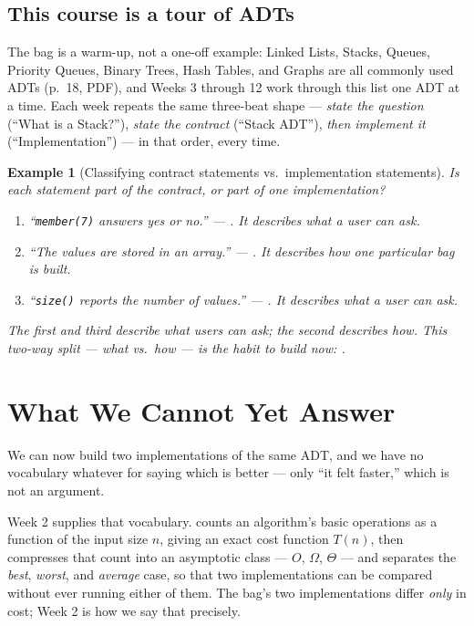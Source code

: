 \documentclass[11pt]{article}
\newtheorem{example}{Example}[section]
\begin{document}
\subsection{This course is a tour of ADTs}

The bag is a warm-up, not a one-off example: Linked Lists, Stacks, Queues,
Priority Queues, Binary Trees, Hash Tables, and Graphs are all
commonly used ADTs \cite{Karumanchi2017_data_structures_algorithms_made_easy}
(p.~18, PDF), and Weeks 3 through 12 work through this list one ADT at a time.
Each week repeats the same three-beat shape --- \emph{state the question}
(``What is a Stack?''), \emph{state the contract} (``Stack ADT''), \emph{then
implement it} (``Implementation'') --- in that order, every time. 

\begin{example}[Classifying contract statements vs.\ implementation statements]
Is each statement part of the contract, or part of one implementation?
\begin{enumerate}
  \item ``\texttt{member(7)} answers yes or no.'' --- . It
    describes what a user can ask.
  \item ``The values are stored in an array.'' --- . It
    describes \emph{how} one particular bag is built.
  \item ``\texttt{size()} reports the number of values.'' --- .
    It describes what a user can ask.
\end{enumerate}
The first and third describe what users can ask; the second describes how. This
two-way split --- what vs.\ how --- is the habit to build now: .
\end{example}

\section{What We Cannot Yet Answer}

We can now build two implementations of the same ADT, and we have no vocabulary
whatever for saying which is better --- only ``it felt faster,'' which is not an
argument.

Week 2 supplies that vocabulary.  counts an algorithm's
basic operations as a function of the input size $n$, giving an exact cost
function $T(n)$, then compresses that count into an asymptotic class ---
$O$, $\Omega$, $\Theta$ --- and separates the \emph{best}, \emph{worst}, and
\emph{average} case, so that two implementations can be compared without ever
running either of them. The bag's two implementations differ \emph{only} in
cost; Week 2 is how we say that precisely.
\end{document}
